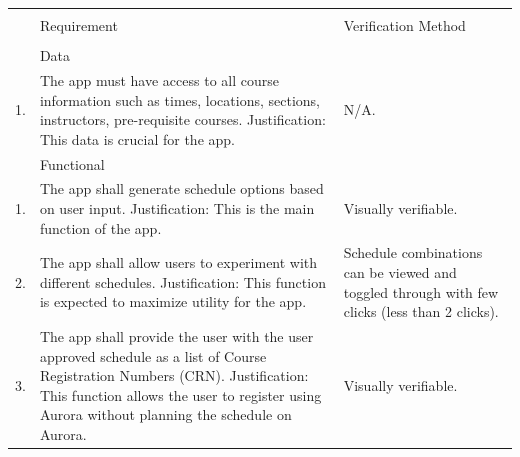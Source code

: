 \documentclass{article}
\begin{document}
\begin{tabular}{ |p{0.3cm}||p{7cm}|p{7cm}|  }
 
 
 
 \hline
&&
  \\
 &
\Large {Requirement }
  &
  \Large {Verification Method}
  \\
&&
  \\
  
 \hline
  &
\multicolumn{2}{|l|}{\large Data}
\\
\hline
1.
&
The app must have access to all course information such as times, locations, sections, instructors, pre-requisite courses.
\newline
Justification: This data is crucial for the app.
& 
N/A.
\\

\hline
 &
\multicolumn{2}{|l|}{ \large Functional}
  \\
  \hline

1. 
 &
 The app shall generate schedule options based on user input.
 \newline
Justification: This is the main function of the app.
 & 
 Visually verifiable.
 \\
 2.
 &
 The app shall allow users to experiment with different schedules.
 \newline
Justification: This function is expected to maximize utility for the app.
 &
 Schedule combinations can be viewed and toggled through with few clicks (less than 2 clicks).
 \\
 3.
 &
 The app shall provide the user with the user approved schedule as a list of Course Registration Numbers (CRN).
 \newline
Justification: This function allows the user to register using Aurora without planning the schedule on Aurora.
 &
 Visually verifiable. 


\end{tabular}
\end{document}
